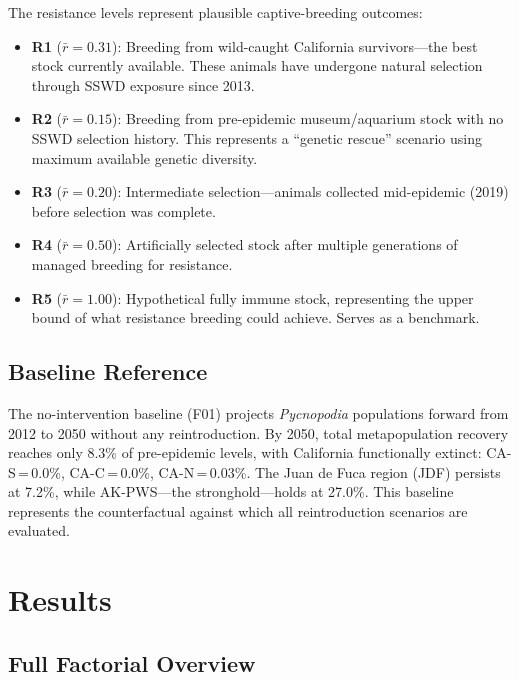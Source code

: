 \documentclass[11pt,a4paper]{article}
\newcommand{\rbar}{\ensuremath{\bar{r}}}
\begin{document}
The resistance levels represent plausible captive-breeding outcomes:
\begin{itemize}[nosep]
  \item \textbf{R1} ($\rbar=0.31$): Breeding from wild-caught California survivors---the best stock currently available. These animals have undergone natural selection through SSWD exposure since 2013.
  \item \textbf{R2} ($\rbar=0.15$): Breeding from pre-epidemic museum/aquarium stock with no SSWD selection history. This represents a ``genetic rescue'' scenario using maximum available genetic diversity.
  \item \textbf{R3} ($\rbar=0.20$): Intermediate selection---animals collected mid-epidemic (2019) before selection was complete.
  \item \textbf{R4} ($\rbar=0.50$): Artificially selected stock after multiple generations of managed breeding for resistance.
  \item \textbf{R5} ($\rbar=1.00$): Hypothetical fully immune stock, representing the upper bound of what resistance breeding could achieve. Serves as a benchmark.
\end{itemize}

\subsection{Baseline Reference}

The no-intervention baseline (F01) projects \textit{Pycnopodia} populations forward from 2012 to 2050 without any reintroduction. By 2050, total metapopulation recovery reaches only 8.3\% of pre-epidemic levels, with California functionally extinct: CA-S\,=\,0.0\%, CA-C\,=\,0.0\%, CA-N\,=\,0.03\%. The Juan de Fuca region (JDF) persists at 7.2\%, while AK-PWS---the stronghold---holds at 27.0\%. This baseline represents the counterfactual against which all reintroduction scenarios are evaluated.


\section{Results}

\subsection{Full Factorial Overview}
\end{document}
